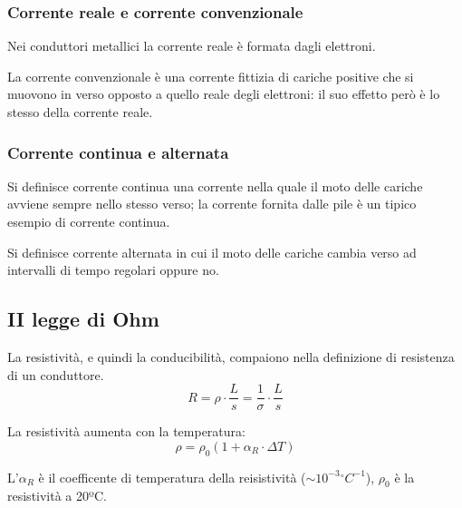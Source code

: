     \subsubsection{Corrente reale e corrente convenzionale}
        \par Nei conduttori metallici la corrente reale è formata dagli elettroni.
        \par La corrente convenzionale è una corrente fittizia di cariche positive che si muovono in verso opposto a quello reale degli elettroni: il suo effetto però è lo stesso della corrente reale.
    \subsubsection{Corrente continua e alternata}
        \par Si definisce corrente continua una corrente nella quale il moto delle cariche avviene sempre nello stesso verso; la corrente fornita dalle pile è un tipico esempio di corrente continua.
        \par Si definisce corrente alternata in cui il moto delle cariche cambia verso ad intervalli di tempo regolari oppure no.
\subsection{II legge di Ohm}
    \par La resistività, e quindi la conducibilità, compaiono nella definizione di resistenza di un conduttore.
    \begin{equation}\label{eq:472ohm}
        R=\rho\cdot\frac{L}{s}=\frac{1}{\sigma}\cdot\frac{L}{s}
    \end{equation}
    \par La resistività aumenta con la temperatura:
    \begin{equation*}
        \rho=\rho_0(1+\alpha_R\cdot\Delta T)
    \end{equation*}
    \par L'$\alpha_R$ è il coefficente di temperatura della reisistività ($\sim 10^{-3}{}^{\circ}C^{-1}$), $\rho_0$ è la resistività a 20ºC.
